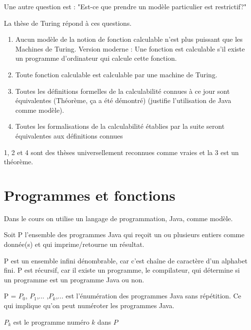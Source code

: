 Une autre question est : "Est-ce que prendre un modèle particulier est restrictif?"

La thèse de Turing répond à ces questions.
\begin{enumerate}
	\item Aucun modèle de la notion de fonction calculable n'est plus puissant que les Machines de Turing.
		Version moderne : Une fonction est calculable s'il existe un programme d'ordinateur qui calcule cette fonction.
	\item Toute fonction calculable est calculable par une machine de Turing.
	\item Toutes les définitions formelles de la calculabilité connues à ce jour sont équivalentes (Théorème, ça a été démontré) (justifie l'utilisation de Java comme modèle).
	\item Toutes les formalisations de la calculabilité établies par la
		suite seront équivalentes aux définitions connues
\end{enumerate}
1, 2 et 4 sont des thèses universellement reconnues comme vraies et la 3 est un théorème.


\section{Programmes et fonctions}
\label{sub:programmes_et_fonctions}
Dans le cours on utilise un langage de programmation, Java, comme modèle.

\begin{mydef}[P]
	Soit P l'ensemble des programmes Java qui reçoit un ou plusieurs entiers comme donnée(s) et qui imprime/retourne un résultat.
\end{mydef}

\begin{myprop}
	P est un ensemble infini dénombrable, car c'est chaîne de caractère d'un alphabet fini. P est récursif, car il existe un programme, le compilateur, qui détermine si un programme est un programme Java ou non.
\end{myprop}

\begin{mydef}[Énumération de P]
	P = $P_0$, $P_1$,... ,$P_k$,... est l'énumération des programmes Java sans répétition. Ce qui implique qu'on peut numéroter les programmes Java.\\
\end{mydef}

\begin{mydef}[$P_k$]
	$P_k$ est le programme numéro $k$ dans $P$
\end{mydef}


